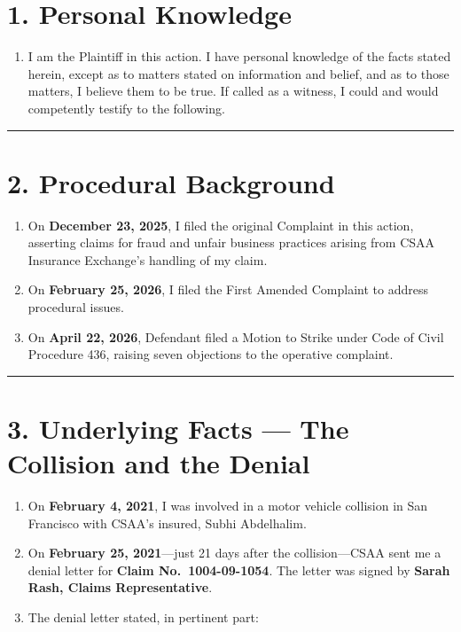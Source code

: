 \section{1. Personal Knowledge}\label{personal-knowledge}

\begin{enumerate}
\def\labelenumi{\arabic{enumi}.}
\tightlist
\item
  I am the Plaintiff in this action. I have personal knowledge of the facts stated herein, except as to matters stated on information and belief, and as to those matters, I believe them to be true. If called as a witness, I could and would competently testify to the following.
\end{enumerate}

\begin{center}\rule{0.5\linewidth}{0.5pt}\end{center}

\section{2. Procedural Background}\label{procedural-background}

\begin{enumerate}
\def\labelenumi{\arabic{enumi}.}
\setcounter{enumi}{1}
\item
  On \textbf{December 23, 2025}, I filed the original Complaint in this action, asserting claims for fraud and unfair business practices arising from CSAA Insurance Exchange's handling of my claim.
\item
  On \textbf{February 25, 2026}, I filed the First Amended Complaint to address procedural issues.
\item
  On \textbf{April 22, 2026}, Defendant filed a Motion to Strike under Code of Civil Procedure \textsection{} 436, raising seven objections to the operative complaint.
\end{enumerate}

\begin{center}\rule{0.5\linewidth}{0.5pt}\end{center}

\section{3. Underlying Facts --- The Collision and the Denial}\label{underlying-facts-the-collision-and-the-denial}

\begin{enumerate}
\def\labelenumi{\arabic{enumi}.}
\setcounter{enumi}{4}
\item
  On \textbf{February 4, 2021}, I was involved in a motor vehicle collision in San Francisco with CSAA's insured, Subhi Abdelhalim.
\item
  On \textbf{February 25, 2021}---just 21 days after the collision---CSAA sent me a denial letter for \textbf{Claim No.~1004-09-1054}. The letter was signed by \textbf{Sarah Rash, Claims Representative}.
\item
  The denial letter stated, in pertinent part:
\end{enumerate}

